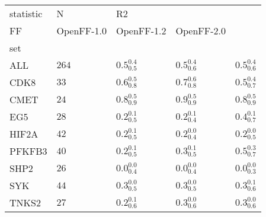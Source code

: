 \begin{tabular}{lllll}
\toprule
statistic &      N & \multicolumn{3}{l}{R2} \\
FF &         OpenFF-1.0 &         OpenFF-1.2 &         OpenFF-2.0 \\
set    &        &                    &                    &                    \\
\midrule
ALL    &  $264$ &  $0.5^{0.4}_{0.5}$ &  $0.5^{0.4}_{0.6}$ &  $0.5^{0.4}_{0.6}$ \\
CDK8   &   $33$ &  $0.6^{0.5}_{0.8}$ &  $0.7^{0.6}_{0.8}$ &  $0.5^{0.4}_{0.7}$ \\
CMET   &   $24$ &  $0.8^{0.5}_{0.9}$ &  $0.9^{0.5}_{0.9}$ &  $0.8^{0.5}_{0.9}$ \\
EG5    &   $28$ &  $0.2^{0.1}_{0.5}$ &  $0.2^{0.1}_{0.4}$ &  $0.4^{0.1}_{0.7}$ \\
HIF2A  &   $42$ &  $0.2^{0.1}_{0.5}$ &  $0.2^{0.0}_{0.4}$ &  $0.2^{0.0}_{0.5}$ \\
PFKFB3 &   $40$ &  $0.2^{0.1}_{0.5}$ &  $0.3^{0.1}_{0.5}$ &  $0.5^{0.3}_{0.7}$ \\
SHP2   &   $26$ &  $0.0^{0.0}_{0.4}$ &  $0.0^{0.0}_{0.4}$ &  $0.0^{0.0}_{0.3}$ \\
SYK    &   $44$ &  $0.3^{0.0}_{0.5}$ &  $0.3^{0.0}_{0.5}$ &  $0.3^{0.1}_{0.6}$ \\
TNKS2  &   $27$ &  $0.2^{0.1}_{0.6}$ &  $0.3^{0.0}_{0.6}$ &  $0.3^{0.0}_{0.6}$ \\
\bottomrule
\end{tabular}
